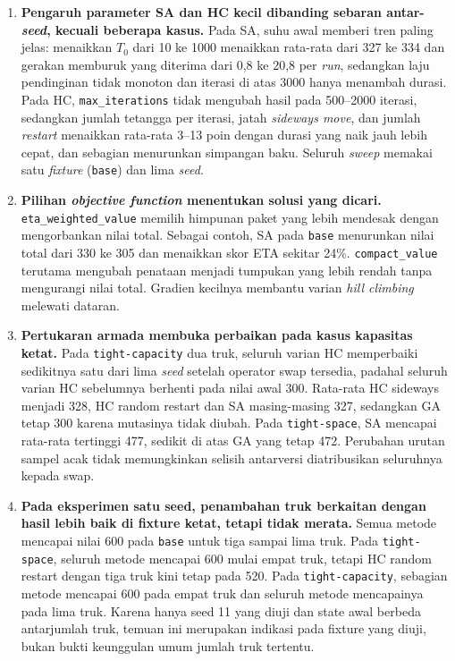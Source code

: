 \begin{enumerate}
    \item \textbf{Pengaruh parameter SA dan HC kecil dibanding sebaran antar-\textit{seed}, kecuali beberapa kasus.} Pada SA, suhu awal memberi tren paling jelas: menaikkan $T_0$ dari 10 ke 1000 menaikkan rata-rata dari 327 ke 334 dan gerakan memburuk yang diterima dari 0,8 ke 20,8 per \textit{run}, sedangkan laju pendinginan tidak monoton dan iterasi di atas 3000 hanya menambah durasi. Pada HC, \texttt{max\_iterations} tidak mengubah hasil pada 500--2000 iterasi, sedangkan jumlah tetangga per iterasi, jatah \textit{sideways move}, dan jumlah \textit{restart} menaikkan rata-rata 3--13 poin dengan durasi yang naik jauh lebih cepat, dan sebagian menurunkan simpangan baku. Seluruh \textit{sweep} memakai satu \textit{fixture} (\texttt{base}) dan lima \textit{seed}.

    \item \textbf{Pilihan \textit{objective function} menentukan solusi yang dicari.} \texttt{eta\_weighted\_value} memilih himpunan paket yang lebih mendesak dengan mengorbankan nilai total. Sebagai contoh, SA pada \texttt{base} menurunkan nilai total dari 330 ke 305 dan menaikkan skor ETA sekitar 24\%. \texttt{compact\_value} terutama mengubah penataan menjadi tumpukan yang lebih rendah tanpa mengurangi nilai total. Gradien kecilnya membantu varian \textit{hill climbing} melewati dataran.

    \item \textbf{Pertukaran armada membuka perbaikan pada kasus kapasitas ketat.} Pada \texttt{tight-capacity} dua truk, seluruh varian HC memperbaiki sedikitnya satu dari lima \textit{seed} setelah operator swap tersedia, padahal seluruh varian HC sebelumnya berhenti pada nilai awal 300. Rata-rata HC sideways menjadi 328, HC random restart dan SA masing-masing 327, sedangkan GA tetap 300 karena mutasinya tidak diubah. Pada \texttt{tight-space}, SA mencapai rata-rata tertinggi 477, sedikit di atas GA yang tetap 472. Perubahan urutan sampel acak tidak memungkinkan selisih antarversi diatribusikan seluruhnya kepada swap.

    \item \textbf{Pada eksperimen satu seed, penambahan truk berkaitan dengan hasil lebih baik di fixture ketat, tetapi tidak merata.} Semua metode mencapai nilai 600 pada \texttt{base} untuk tiga sampai lima truk. Pada \texttt{tight-space}, seluruh metode mencapai 600 mulai empat truk, tetapi HC random restart dengan tiga truk kini tetap pada 520. Pada \texttt{tight-capacity}, sebagian metode mencapai 600 pada empat truk dan seluruh metode mencapainya pada lima truk. Karena hanya seed 11 yang diuji dan state awal berbeda antarjumlah truk, temuan ini merupakan indikasi pada fixture yang diuji, bukan bukti keunggulan umum jumlah truk tertentu.
\end{enumerate}

